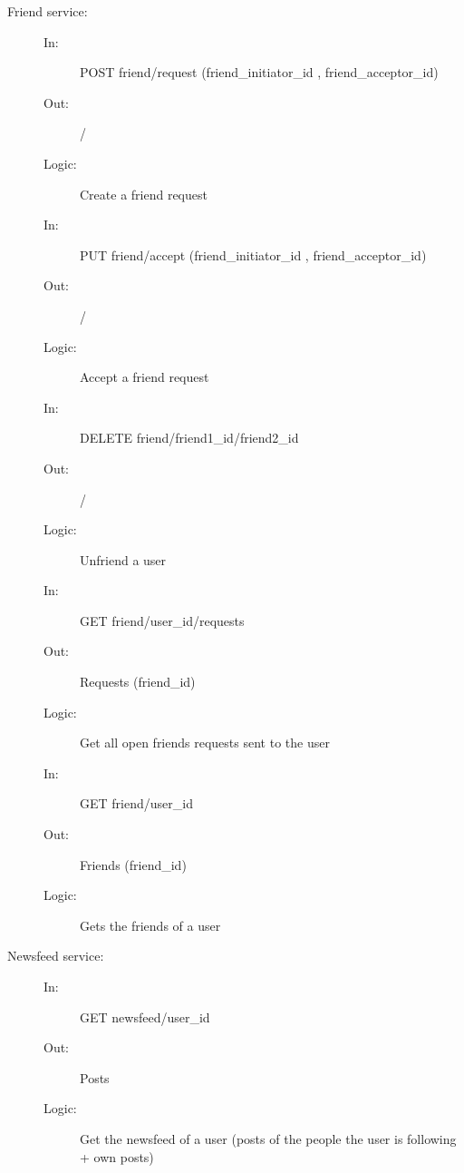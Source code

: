 \documentclass{article}
\begin{document}
\begin{description}
    \item [Friend service:]
    \begin{description}
        \item[]
        \item[In:] POST friend/request (friend\_initiator\_id , friend\_acceptor\_id)
        \item[Out:] /
        \item[Logic:] Create a friend request
        \item[]
    \end{description}
    \begin{description}
        \item[]
        \item[In:] PUT friend/accept (friend\_initiator\_id , friend\_acceptor\_id)
        \item[Out:] /
        \item[Logic:] Accept a friend request
        \item[]
    \end{description}
    \begin{description}
        \item[In:] DELETE friend/friend1\_id/friend2\_id
        \item[Out:] /
        \item[Logic:] Unfriend a user
        \item[]
    \end{description}
    \begin{description}
        \item[In:] GET friend/user\_id/requests
        \item[Out:] Requests (friend\_id)
        \item[Logic:] Get all open friends requests sent to the user
        \item[]
    \end{description}
    \begin{description}
        \item[In:] GET friend/user\_id
        \item[Out:] Friends (friend\_id)
        \item[Logic:] Gets the friends of a user
    \end{description}
\end{description}

\begin{description}
    \item [Newsfeed service:] 
    \begin{description}
        \item[]
        \item[In:] GET newsfeed/user\_id
        \item[Out:] Posts
        \item[Logic:] Get the newsfeed of a user (posts of the people the user is following + own posts)
    \end{description}
\end{description}
\end{document}

